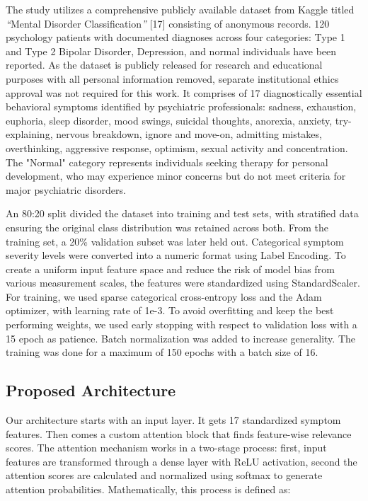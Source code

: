\documentclass[conference]{IEEEtran}
\begin{document}
The study utilizes a comprehensive publicly available dataset from Kaggle titled \emph{``}Mental Disorder Classification\emph{''} {[}17{]} consisting of anonymous records. 120 psychology patients with documented diagnoses across four categories: Type 1 and Type 2 Bipolar Disorder, Depression, and normal individuals have been reported. As the dataset is publicly released for research and educational purposes with all personal information removed, separate institutional ethics approval was not required for this work. It comprises of 17 diagnostically essential behavioral symptoms identified by psychiatric professionals: sadness, exhaustion, euphoria, sleep disorder, mood swings, suicidal thoughts, anorexia, anxiety, try-explaining, nervous breakdown, ignore and move-on, admitting mistakes, overthinking, aggressive response, optimism, sexual activity and concentration. The "Normal" category represents individuals seeking therapy for personal development, who may experience minor concerns but do not meet criteria for major psychiatric disorders.

An 80:20 split divided the dataset into training and test sets, with stratified data ensuring the original class distribution was retained across both. From the training set, a 20\% validation subset was later held out. Categorical symptom severity levels were converted into a numeric format using Label Encoding. To create a uniform input feature space and reduce the risk of model bias from various measurement scales, the features were standardized using StandardScaler. For training, we used sparse categorical cross-entropy loss and the Adam optimizer, with learning rate of 1e-3. To avoid overfitting and keep the best performing weights, we used early stopping with respect to validation loss with a 15 epoch as patience. Batch normalization was added to increase generality. The training was done for a maximum of 150 epochs with a batch size of 16.

\subsection{Proposed Architecture}

Our architecture starts with an input layer. It gets 17 standardized symptom features. Then comes a custom attention block that finds feature-wise relevance scores. The attention mechanism works in a two-stage process: first, input features are transformed through a dense layer with ReLU activation, second the attention scores are calculated and normalized using softmax to generate attention probabilities. Mathematically, this process is defined as:
\end{document}
